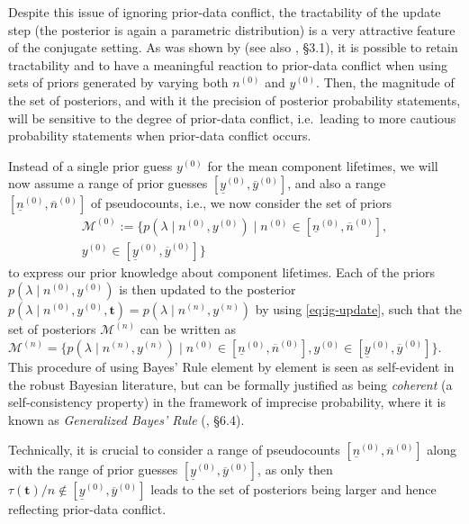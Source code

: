 \documentclass[12pt,a4paper,twocolumn,fleqn]{narms}
\renewcommand{\vec}[1]{{\bm#1}}
\newcommand{\uz}{^{(0)}} %
\newcommand{\un}{^{(n)}} %
\newcommand{\ul}[1]{\underline{#1}}
\newcommand{\ol}[1]{\overline{#1}}
\def\yz{y\uz}
\def\yn{y\un}
\def\yzl{\ul{y}\uz}
\def\yzu{\ol{y}\uz}
\def\nz{n\uz}
\def\nn{n\un}
\def\nzl{\ul{n}\uz}
\def\nzu{\ol{n}\uz}
\def\taut{\tau(\vec{t})}
\def\MZ{\mathcal{M}\uz}
\def\MN{\mathcal{M}\un}
\begin{document}
Despite this issue of ignoring prior-data conflict,
the tractability of the update step
(the posterior is again a parametric distribution)
is a very attractive feature of the conjugate setting.
As was shown by  (see also , \S 3.1),
it is possible to retain tractability and to have a meaningful reaction to prior-data conflict
when using sets of priors generated by varying both $\nz$ and $\yz$.
Then, the magnitude of the set of posteriors,
and with it the precision of posterior probability statements,
will be sensitive to the degree of prior-data conflict,
i.e.\ leading to more cautious probability statements when prior-data conflict occurs.

Instead of a single prior guess $\yz$ for the mean component lifetimes,
we will now assume a range of prior guesses $[\yzl, \yzu]$, and also a range $[\nzl, \nzu]$ of pseudocounts,
i.e., we now consider the set of priors
\begin{multline}
\MZ := \{ p(\lambda\mid\nz,\yz) \mid \nz \in [\nzl, \nzu],\\ \yz \in [\yzl, \yzu] \}
\label{eq:setofpriors}
\end{multline}
to express our prior knowledge about component lifetimes.
Each of the priors $p(\lambda\mid\nz,\yz)$ is then updated to the posterior
$p(\lambda\mid\nz,\yz,\vec{t}) = p(\lambda\mid\nn,\yn)$
by using \eqref{eq:ig-update},
such that the set of posteriors $\MN$ can be written as
$\MN = \{ p(\lambda\mid\nn,\yn) \mid \nz \in [\nzl, \nzu], \yz \in [\yzl, \yzu] \}$.
This procedure of using Bayes' Rule element by element
is seen as self-evident in the robust Bayesian literature,
but can be formally justified as being \emph{coherent}
(a self-consistency property)
in the framework of imprecise probability, where it is known as
\emph{Generalized Bayes' Rule} (, \S 6.4).

Technically, it is crucial to consider a range of pseudocounts $[\nzl, \nzu]$
along with the range of prior guesses $[\yzl, \yzu]$,
as only then $\taut/n \not\in [\yzl, \yzu]$
leads to the set of posteriors being larger
and hence reflecting prior-data conflict.
\end{document}
